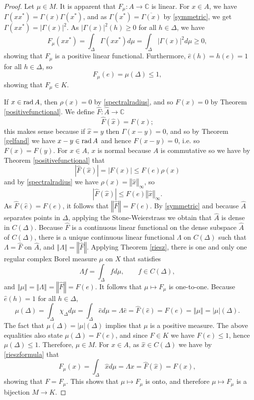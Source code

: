 \documentclass{article}
\newcommand{\rad}{\ensuremath\mathrm{rad}\,}
\newcommand{\norm}[1]{\left\Vert #1 \right\Vert}
\theoremstyle{definition}
\theoremstyle{definition}
\begin{document}
\begin{proof}
Let $\mu \in M$. It is apparent that $F_\mu:A \to \mathbb{C}$ is linear. For $x \in A$, we have $\Gamma(xx^*)=\Gamma(x)\Gamma(x^*)$, and as $\Gamma(x^*)=\overline{\Gamma(x)}$ by \eqref{symmetric}, we get
$\Gamma(xx^*)=|\Gamma(x)|^2$. As $|\Gamma(x)|^2(h) \geq 0$ for all $h \in \Delta$, we have
\[
F_\mu(xx^*) = \int_\Delta \Gamma(xx^*) d\mu = \int_\Delta |\Gamma(x)|^2 d\mu \geq 0,
\]
showing that $F_\mu$ is a positive linear functional. Furthermore, $\hat{e}(h)=h(e)=1$ for all $h \in \Delta$, so
\[
F_\mu(e)=\mu(\Delta) \leq 1,
\]
showing that $F_\mu \in K$.

If $x \in \rad A$, then $\rho(x)=0$ by \eqref{spectralradius}, and so $F(x)=0$ by Theorem \ref{positivefunctional}. We define $\widehat{F}:\widehat{A} \to \mathbb{C}$
\[
\widehat{F}(\hat{x})=F(x);
\]
this makes sense because if $\hat{x}=\hat{y}$ then $\Gamma(x-y)=0$, and so by Theorem \ref{gelfand} we have $x-y \in \rad A$ and hence $F(x-y)=0$, i.e.
so $F(x)=F(y)$. For $x \in A$, $x$ is normal because $A$ is commutative so we have by Theorem \ref{positivefunctional} that
\[
|\widehat{F}(\hat{x})| = |F(x)| \leq F(e)\rho(x)
\]
and by \eqref{spectralradius} we have $\rho(x)=\norm{\hat{x}}_\infty$, so 
\[
|\widehat{F}(\hat{x})| \leq F(e) \norm{\hat{x}}_\infty.
\]
As $\widehat{F}(\hat{e}) = F(e)$, it follows that $\norm{\widehat{F}}=F(e)$.
By \eqref{symmetric} and because $\widehat{A}$ separates points in $\Delta$,
applying the Stone-Weierstrass we obtain that $\widehat{A}$ is dense in $C(\Delta)$. 
Because $\widehat{F}$ is a continuous linear
functional on the dense subspace $\widehat{A}$ of $C(\Delta)$, there is a unique continuous linear functional
$\Lambda$ on $C(\Delta)$ such that 
$\Lambda=\widehat{F}$ on $\widehat{A}$, and $\norm{\Lambda}=\norm{\widehat{F}}$.
Applying Theorem \ref{riesz}, there is one and only one regular complex Borel measure $\mu$ on $X$ that satisfies
\begin{equation}
\Lambda f = \int_\Delta f d\mu, \qquad f \in C(\Delta),
\label{rieszformula}
\end{equation}
and $\norm{\mu}=\norm{\Lambda}=\norm{\widehat{F}}=F(e)$. It follows that $\mu \mapsto F_\mu$ is one-to-one. 
Because $\hat{e}(h)=1$ for all $h \in \Delta$,
\[
\mu(\Delta) = \int_\Delta \chi_\Delta d\mu = \int_\Delta \hat{e} d\mu = \Lambda \hat{e} = \widehat{F}(\hat{e}) = F(e) = \norm{\mu} = |\mu|(\Delta).
\]
The fact that $\mu(\Delta)=|\mu|(\Delta)$ implies that $\mu$ is a positive measure. The above equalities also state $\mu(\Delta)=F(e)$, and
since $F \in K$ we have $F(e) \leq 1$, hence $\mu(\Delta) \leq 1$. Therefore, $\mu \in M$. For $x \in A$, as $\hat{x} \in C(\Delta)$ we have
 by \eqref{rieszformula} that
\[
F_\mu(x) = \int_\Delta \hat{x} d\mu = \Lambda \hat{x} =\widehat{F}(\hat{x}) = F(x),
\]
showing that $F=F_\mu$. This shows that $\mu \mapsto F_\mu$ is onto, and therefore $\mu \mapsto F_\mu$ is a bijection
$M \to K$.
\end{proof}
\end{document}
